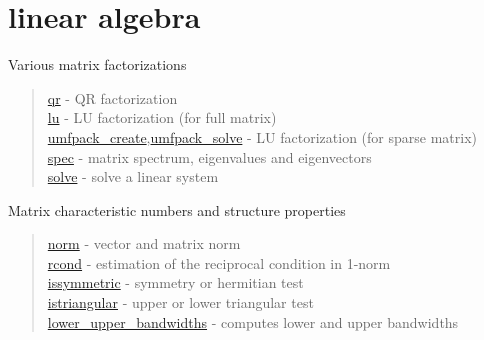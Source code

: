 \chapter*{linear algebra}

Various matrix factorizations

\begin{quote}
\noindent
\hyperlink{qr}{qr} - QR factorization\\
\hyperlink{lu}{lu} - LU factorization (for full matrix) \\
\hyperlink{umfpack_create}{umfpack\_create},\hyperlink{umfpack_solve}{umfpack\_solve}
- LU factorization (for sparse matrix) \\
\hyperlink{spec}{spec} - matrix spectrum, eigenvalues and eigenvectors\\
\hyperlink{solve}{solve} - solve a linear system\\
\end{quote}

Matrix characteristic numbers and structure properties

\begin{quote}
\noindent
\hyperlink{norm}{norm} - vector and matrix norm\\
\hyperlink{rcond}{rcond} - estimation of the reciprocal condition in 1-norm\\
\hyperlink{issymmetric}{issymmetric} - symmetry or hermitian test\\
\hyperlink{istriangular}{istriangular} - upper or lower triangular test\\
\hyperlink{lower_upper_bandwidths}{lower\_upper\_bandwidths} - computes lower and upper bandwidths\\
\end{quote}

 
 
 
 
 
 
 
 


